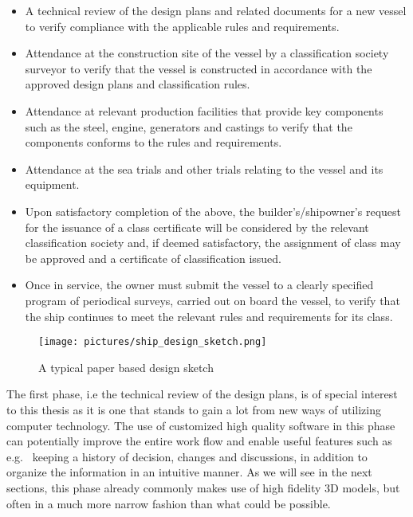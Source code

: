 \begin{itemize}
	\item A technical review of the design plans and related documents for a new vessel to verify compliance with the applicable rules and requirements.
	\item Attendance at the construction site of the vessel by a classification society surveyor to verify that the vessel is 
		  constructed in accordance with the approved design plans and classification rules.
	\item Attendance at relevant production facilities that provide key components such as the steel, engine, generators and castings to verify that the components conforms to
		  the rules and requirements.
	\item Attendance at the sea trials and other trials relating to the vessel and its equipment.
	\item Upon satisfactory completion of the above, the builder’s/shipowner’s request for the issuance of a class certificate will be considered by the 
		  relevant classification society and, if deemed satisfactory, the assignment of class may be approved and a certificate of classification issued.
	\item Once in service, the owner must submit the vessel to a clearly specified program of periodical surveys, carried out on board the vessel, 
		  to verify that the ship continues to meet the relevant rules and requirements for its class.
\end{itemize}

\begin{figure}%
	\texttt{[image: pictures/ship\_design\_sketch.png]}
	\caption[A typical paper based design sketch]{A typical paper based design sketch~\cite{MarinoConsult}}
	\label{fig:ship_design_sketch}
\end{figure} 

The first phase, i.e the technical review of the design plans, is of special interest to this thesis as it is one that stands to gain a lot from 
new ways of utilizing computer technology. The use of customized high quality software in this phase can potentially improve the entire work flow and enable useful 
features such as e.g.~ keeping a history of decision, changes and discussions, in addition to organize the information in an intuitive manner. 
As we will see in the next sections, this phase already commonly makes use of high fidelity 3D models, but often in a much more narrow fashion than 
what could be possible. 

